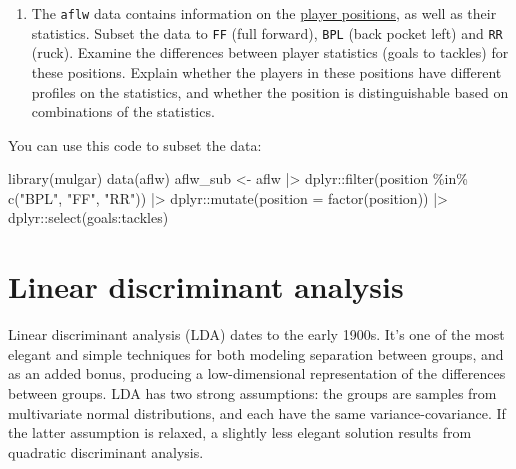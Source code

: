 \documentclass[
  letterpaper,
]{krantz}
\newenvironment{Shaded}{\begin{snugshade}}{\end{snugshade}}
\newcommand{\AttributeTok}[1]{\textcolor[rgb]{0.40,0.45,0.13}{#1}}
\newcommand{\FunctionTok}[1]{\textcolor[rgb]{0.28,0.35,0.67}{#1}}
\newcommand{\NormalTok}[1]{\textcolor[rgb]{0.00,0.23,0.31}{#1}}
\newcommand{\OtherTok}[1]{\textcolor[rgb]{0.00,0.23,0.31}{#1}}
\newcommand{\SpecialCharTok}[1]{\textcolor[rgb]{0.37,0.37,0.37}{#1}}
\newcommand{\StringTok}[1]{\textcolor[rgb]{0.13,0.47,0.30}{#1}}
\providecommand{\tightlist}{%
  \setlength{\itemsep}{0pt}\setlength{\parskip}{0pt}}
\begin{document}
\begin{enumerate}
\def\labelenumi{\arabic{enumi}.}
\setcounter{enumi}{3}
\tightlist
\item
  The \texttt{aflw} data contains information on the
  \href{https://en.wikipedia.org/wiki/Australian_rules_football_positions}{player
  positions}, as well as their statistics. Subset the data to
  \texttt{FF} (full forward), \texttt{BPL} (back pocket left) and
  \texttt{RR} (ruck). Examine the differences between player statistics
  (goals to tackles) for these positions. Explain whether the players in
  these positions have different profiles on the statistics, and whether
  the position is distinguishable based on combinations of the
  statistics. 
\end{enumerate}

You can use this code to subset the data:

\begin{Shaded}
\begin{Highlighting}[]
\FunctionTok{library}\NormalTok{(mulgar)}
\FunctionTok{data}\NormalTok{(aflw)}
\NormalTok{aflw\_sub }\OtherTok{\textless{}{-}}\NormalTok{ aflw }\SpecialCharTok{|\textgreater{}} 
\NormalTok{  dplyr}\SpecialCharTok{::}\FunctionTok{filter}\NormalTok{(position }\SpecialCharTok{\%in\%} \FunctionTok{c}\NormalTok{(}\StringTok{"BPL"}\NormalTok{, }\StringTok{"FF"}\NormalTok{, }\StringTok{"RR"}\NormalTok{)) }\SpecialCharTok{|\textgreater{}}
\NormalTok{  dplyr}\SpecialCharTok{::}\FunctionTok{mutate}\NormalTok{(}\AttributeTok{position =} \FunctionTok{factor}\NormalTok{(position)) }\SpecialCharTok{|\textgreater{}}
\NormalTok{  dplyr}\SpecialCharTok{::}\FunctionTok{select}\NormalTok{(goals}\SpecialCharTok{:}\NormalTok{tackles)}
\end{Highlighting}
\end{Shaded}

\chapter{Linear discriminant analysis}\label{sec-lda}


Linear discriminant analysis (LDA) dates to the early 1900s. It's one of
the most elegant and simple techniques for both modeling separation
between groups, and as an added bonus, producing a low-dimensional
representation of the differences between groups. LDA has two strong
assumptions: the groups are samples from multivariate normal
distributions, and each have the same variance-covariance. If the latter
assumption is relaxed, a slightly less elegant solution results from
quadratic discriminant analysis.
\end{document}
